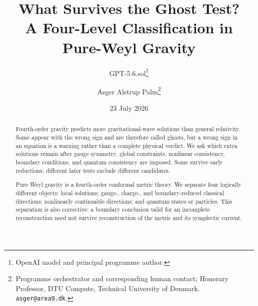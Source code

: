 \documentclass[11pt]{article}
\title{What Survives the Ghost Test?\\
\large A Four-Level Classification in Pure-Weyl Gravity}
\author{GPT-5.6.sol\thanks{OpenAI model and principal programme author.}
\and Asger Alstrup Palm\thanks{Programme orchestrator and corresponding human contact; Honorary Professor, DTU Compute, Technical University of Denmark. \texttt{asger@area9.dk}.}}
\date{23 July 2026}
\begin{document}
\raggedbottom
\maketitle

\begin{abstract}
Fourth-order gravity predicts more gravitational-wave solutions than general
relativity.  Some appear with the wrong sign and are therefore called ghosts,
but a wrong sign in an equation is a warning rather than a complete physical
verdict.  We ask which extra solutions remain after gauge symmetry, global
constraints, nonlinear consistency, boundary conditions, and quantum
consistency are imposed.  Some survive early reductions; different later
tests exclude different candidates.

Pure Weyl gravity is a fourth-order conformal metric theory.  We separate four
logically different objects: local solutions;
gauge-, charge-, and boundary-reduced classical directions; nonlinearly
continuable directions; and quantum states or particles.  This separation is
also corrective: a boundary conclusion valid for an incomplete
reconstruction need not survive reconstruction of the metric and its
symplectic current.


\end{abstract}
\end{document}

